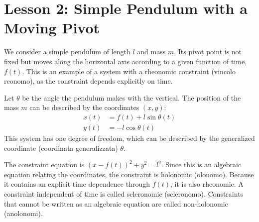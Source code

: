 \section*{Lesson 2: Simple Pendulum with a Moving Pivot}

We consider a simple pendulum of length $l$ and mass $m$. Its pivot point is not fixed but moves along the horizontal axis according to a given function of time, $f(t)$. This is an example of a system with a rheonomic constraint (vincolo reonomo), as the constraint depends explicitly on time.

Let $\theta$ be the angle the pendulum makes with the vertical. The position of the mass $m$ can be described by the coordinates $(x, y)$: 
\begin{align*}
    x(t) &= f(t) + l\sin\theta(t) \\
    y(t) &= -l\cos\theta(t)
\end{align*}
This system has one degree of freedom, which can be described by the generalized coordinate (coordinata generalizzata) $\theta$.

The constraint equation is $(x - f(t))^2 + y^2 = l^2$. Since this is an algebraic equation relating the coordinates, the constraint is holonomic (olonomo). Because it contains an explicit time dependence through $f(t)$, it is also rheonomic. A constraint independent of time is called scleronomic (scleronomo). Constraints that cannot be written as an algebraic equation are called non-holonomic (anolonomi).

